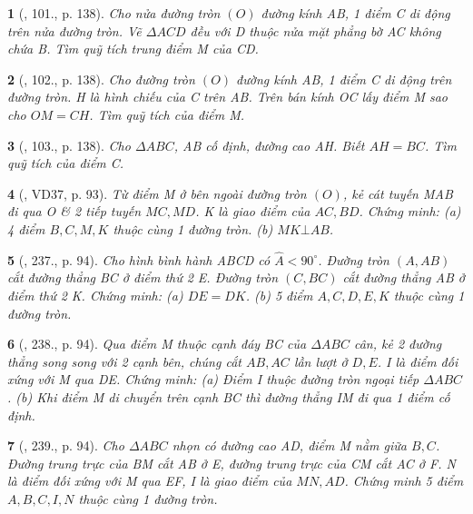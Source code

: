\documentclass{article}
\newtheorem{baitoan}{}
\begin{document}
\begin{baitoan}[\cite{Tuyen_Toan_9_old}, 101., p. 138]
	Cho nửa đường tròn $(O)$ đường kính AB, 1 điểm C di động trên nửa đường tròn. Vẽ $\Delta ACD$ đều với D thuộc nửa mặt phẳng bờ AC không chứa B. Tìm quỹ tích trung điểm M của CD.
\end{baitoan}

\begin{baitoan}[\cite{Tuyen_Toan_9_old}, 102., p. 138]
	Cho đường tròn $(O)$ đường kính AB, 1 điểm C di động trên đường tròn. H là hình chiếu của C trên AB. Trên bán kính OC lấy điểm M sao cho $OM = CH$. Tìm quỹ tích của điểm M.
\end{baitoan}

\begin{baitoan}[\cite{Tuyen_Toan_9_old}, 103., p. 138]
	Cho $\Delta ABC$, AB cố định, đường cao AH. Biết $AH = BC$. Tìm quỹ tích của điểm C.
\end{baitoan}

\begin{baitoan}[\cite{Binh_Toan_9_tap_2}, VD37, p. 93]
	Từ điểm M ở bên ngoài đường tròn $(O)$, kẻ cát tuyến MAB đi qua O \& 2 tiếp tuyến $MC,MD$. K là giao điểm của $AC,BD$. Chứng minh: (a) 4 điểm $B,C,M,K$ thuộc cùng 1 đường tròn. (b) $MK\bot AB$.
\end{baitoan}

\begin{baitoan}[\cite{Binh_Toan_9_tap_2}, 237., p. 94]
	Cho hình bình hành ABCD có $\widehat{A} < 90^\circ$. Đường tròn $(A,AB)$ cắt đường thẳng BC ở điểm thứ 2 E. Đường tròn $(C,BC)$ cắt đường thẳng AB ở điểm thứ 2 K. Chứng minh: (a) $DE = DK$. (b) 5 điểm $A,C,D,E,K$ thuộc cùng 1 đường tròn.
\end{baitoan}

\begin{baitoan}[\cite{Binh_Toan_9_tap_2}, 238., p. 94]
	Qua điểm M thuộc cạnh đáy BC của $\Delta ABC$ cân, kẻ 2 đường thẳng song song với 2 cạnh bên, chúng cắt $AB,AC$ lần lượt ở $D,E$. I là điểm đối xứng với M qua DE. Chứng minh: (a) Điểm I thuộc đường tròn ngoại tiếp $\Delta ABC$. (b) Khi điểm M di chuyển trên cạnh BC thì đường thẳng IM đi qua 1 điểm cố định.
\end{baitoan}

\begin{baitoan}[\cite{Binh_Toan_9_tap_2}, 239., p. 94]
	Cho $\Delta ABC$ nhọn có đường cao AD, điểm M nằm giữa $B,C$. Đường trung trực của BM cắt AB ở E, đường trung trực của CM cắt AC ở F. N là điểm đối xứng với M qua EF, I là giao điểm của $MN,AD$. Chứng minh 5 điểm $A,B,C,I,N$ thuộc cùng 1 đường tròn.
\end{baitoan}
\end{document}
